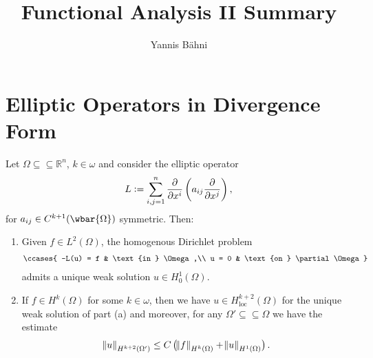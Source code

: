 

\setcounter{section}{1}

\title{Functional Analysis II Summary}
\author{Yannis B\"{a}hni}
\address[Yannis B\"{a}hni]{University of Zurich, R\"{a}mistrasse 71, 8006 Zurich}



\begin{abstract}

\end{abstract}

\maketitle

\tableofcontents

\section*{Elliptic Operators in Divergence Form}

\begin{lemma}
	\label{lem:PI}
\end{lemma}

\begin{theorem}
	\label{thm:RRT}

\end{theorem}

\begin{theorem}
	Let $\Omega \subseteq\subseteq \mathbb{R}^n$, $k \in \omega$ and consider the elliptic operator
	\begin{equation*}
		L := \sum_{i,j = 1}^n \frac{\partial}{\partial x^i}\del[3]{a_{ij}\frac{\partial}{\partial x^j}},
	\end{equation*}
	\noindent for $a_{ij} \in C^{k + 1}(\wbar{\Omega})$ symmetric. Then:
	\begin{enumerate}[label = \textup{(}\alph*\textup{)},wide=0pt]
		\item Given $f \in L^2(\Omega)$, the homogenous Dirichlet problem
			\begin{align}
				\label{eq:HDP}
				\ccases{
					-L(u) = f & \text{in } \Omega,\\
					u = 0 & \text{on } \partial\Omega
				}
			\end{align}
			\noindent admits a unique weak solution $u \in H^1_0(\Omega)$.
		\item If $f \in H^k(\Omega)$ for some $k \in \omega$, then we have $u \in H^{k + 2}_{\mathrm{loc}}(\Omega)$ for the unique weak solution of part (a) and moreover, for any $\Omega' \subseteq \subseteq \Omega$ we have the estimate
			\begin{equation*}
				\norm{u}_{H^{k + 2}(\Omega')} \leq C\del[1]{\norm{f}_{H^k(\Omega)} + \norm{u}_{H^1(\Omega)}}.
			\end{equation*}
	\end{enumerate}
\end{theorem}

